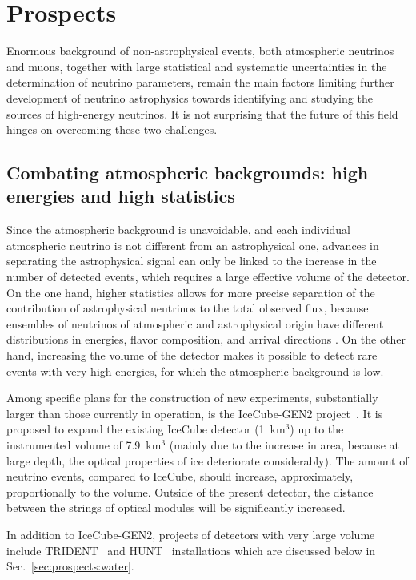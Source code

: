 \documentclass[a4paper,noshowpacs,noshowkeys,floatfix,twocolumn,preprintnumbers,nofootinbib]{revtex4-2}
\begin{document}
\section{Prospects}
\label{sec:prospects}
Enormous background of non-astrophysical events, both atmospheric neutrinos and muons, together with large statistical and systematic uncertainties in the determination of neutrino parameters, remain the main factors limiting further development of neutrino astrophysics towards identifying and studying the sources of high-energy neutrinos. It is not surprising that the future of this field hinges on overcoming these two challenges.

\subsection{Combating atmospheric backgrounds: high energies and high statistics}
\label{sec:prospects:large}
Since the atmospheric background is unavoidable, and each individual atmospheric neutrino is not different from an astrophysical one, advances in separating the astrophysical signal can only be linked to the increase in the number of detected events, which requires a large effective volume of the detector. On the one hand, higher statistics allows for more precise separation of the contribution of astrophysical neutrinos to the total observed flux, because ensembles of neutrinos of atmospheric and astrophysical origin have different distributions in energies, flavor composition, and arrival directions \cite{ST-UFN}. On the other hand, increasing the volume of the detector makes it possible to detect rare events with very high energies, for which the atmospheric background is low.

Among specific plans for the construction of new experiments, substantially larger than those currently in operation, is the IceCube-GEN2 project~\cite{IceCube-Gen2}. It is proposed to expand the existing IceCube detector (1~km$^{3}$) up to the instrumented volume of 7.9~km$^{3}$ (mainly due to the increase in area, because at large depth, the optical properties of ice deteriorate considerably). The amount of neutrino events, compared to IceCube, should increase, approximately, proportionally to the volume. Outside of the present detector, the distance between the strings of optical modules will be significantly increased.

In addition to IceCube-GEN2, projects of detectors with very large volume include TRIDENT~\cite{TRIDENT-8km3} and HUNT~\cite{HUNT-30km3} installations which are discussed below in Sec.~\ref{sec:prospects:water}.
\end{document}
